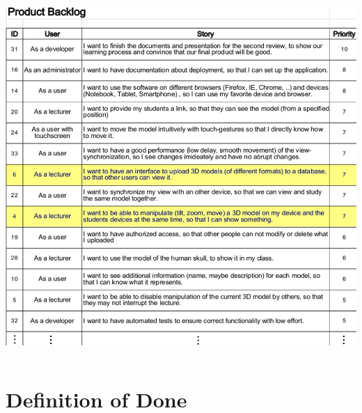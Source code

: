 \begin{frame}
\begin{columns}
    \begin{column}{0.74\textwidth}
      \includegraphics[width=.9\textwidth]{images/product-backlog.png}
    \end{column}
  \end{columns}
\end{frame}


\section{Definition of Done}


